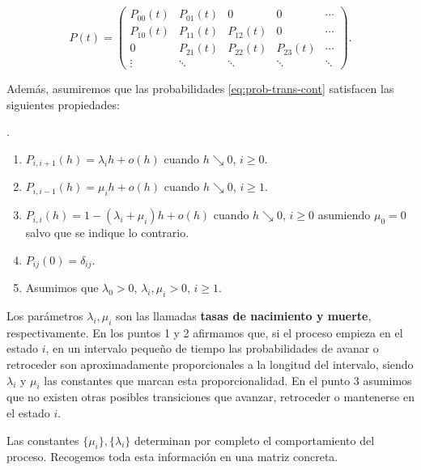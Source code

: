     \begin{equation}
        \label{eq:matriz-pnm-cont}
        P(t) = \begin{pmatrix}
            P_{00}(t) & P_{01}(t) & 0 & 0  & \cdots \\
            P_{10}(t) & P_{11}(t) & P_{12}(t) & 0  & \cdots \\

            0 & P_{21}(t) & P_{22}(t) & P_{23}(t) &  \cdots \\
            \vdots & \ddots & \ddots & \ddots & \ddots 
        \end{pmatrix}.
    \end{equation}

    Además, asumiremos que las probabilidades \eqref{eq:prob-trans-cont} satisfacen las siguientes propiedades:

    .

    \begin{enumerate}
        \item $P_{i,i+1}(h) = \lambda_i h + o(h)$ cuando $h\searrow 0$, $i\geq 0$.
        \item $P_{i,i-1}(h) = \mu_i h + o(h)$ cuando $h\searrow 0$, $i\geq 1$.
        \item $P_{i,i}(h) = 1 - (\lambda_i + \mu_i) h + o(h)$  cuando $h\searrow 0$, $i\geq 0$ asumiendo $\mu_0=0$ salvo que se indique lo contrario.
        \item $P_{ij}(0)=\delta_{ij}$.
        \item Asumimos que $\lambda_0>0$, $\lambda_i, \mu_i > 0$, $i\geq 1$.
    \end{enumerate}

    Los parámetros $\lambda_i, \mu_i$ son las llamadas \textbf{tasas de nacimiento y muerte}, respectivamente. En los puntos 1 y 2 afirmamos que, si el proceso empieza en el estado $i$, en un intervalo pequeño de tiempo las probabilidades de avanar o retroceder son aproximadamente proporcionales a la longitud del intervalo, siendo $\lambda_i$ y $\mu_i$ las constantes que marcan esta proporcionalidad. En el punto 3 asumimos que no existen otras posibles transiciones que avanzar, retroceder o mantenerse en el estado $i$.

    Las constantes $\{\mu_i\}, \{\lambda_i\}$ determinan por completo el comportamiento del proceso. Recogemos toda esta información en una matriz concreta.
    
